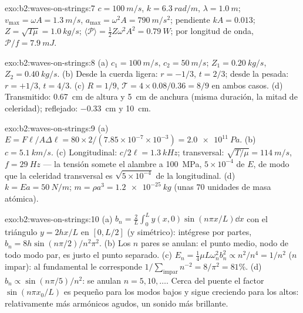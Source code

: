 \begin{solution}{exo:b2:waves-on-strings:7}
$c = \qty{100}{m/s}$, $k = \qty{6.3}{rad/m}$, $\lambda = \qty{1.0}{m}$; $v_{\max} = \omega A =
\qty{1.3}{m/s}$, $a_{\max} = \omega^2A = \qty{790}{m/s^2}$; pendiente $kA = 0.013$; $Z =
\sqrt{T\mu} = \qty{1.0}{kg/s}$; $\langle\mathcal P\rangle = \tfrac12Z\omega^2A^2 = \qty{0.79}{W}$;
por longitud de onda, $\mathcal P/f = \qty{7.9}{mJ}$.
\end{solution}

\begin{solution}{exo:b2:waves-on-strings:8}
(a) $c_1 = \qty{100}{m/s}$, $c_2 = \qty{50}{m/s}$; $Z_1 = \qty{0.20}{kg/s}$, $Z_2 = \qty{0.40}{kg/s}$.
(b) Desde la cuerda ligera: $r = -1/3$, $t = 2/3$; desde la pesada: $r =
+1/3$, $t = 4/3$. (c) $R = 1/9$, $\mathcal T = 4 \times 0.08/0.36 = 8/9$ en ambos casos.
(d) Transmitido: \qty{0.67}{cm} de altura y \qty{5}{cm} de anchura (misma duración, la mitad
de celeridad); reflejado: \qty{-0.33}{cm} y \qty{10}{cm}.
\end{solution}

\begin{solution}{exo:b2:waves-on-strings:9}
(a) $E = F\ell/A\Delta\ell = 80 \times 2/(7.85 \times 10^{-7} \times 10^{-3}) = \qty{2.0e11}{Pa}$.
(b) $c = \qty{5.1}{km/s}$. (c) Longitudinal: $c/2\ell = \qty{1.3}{kHz}$; transversal:
$\sqrt{T/\mu} = \qty{114}{m/s}$, $f = \qty{29}{Hz}$ --- la tensión somete el
alambre a \qty{100}{MPa}, $5 \times 10^{-4}$ de $E$, de modo que la celeridad transversal es
$\sqrt{5 \times 10^{-4}}$ de la longitudinal. (d) $k = Ea = \qty{50}{N/m}$; $m
= \rho a^3 = \qty{1.2e-25}{kg}$ (unas $70$ unidades de masa atómica).
\end{solution}

\begin{solution}{exo:b2:waves-on-strings:10}
(a) $b_n = \frac2L\int_0^Ly(x, 0)\sin(n\pi x/L)\dd x$ con el triángulo $y =
2hx/L$ en $[0, L/2]$ (y simétrico): intégrese por partes, $b_n = 8h\sin(n\pi/2)
/n^2\pi^2$. (b) Los $n$ pares se anulan: el punto medio, nodo de todo modo par,
es justo el punto separado. (c) $E_n = \tfrac14\mu L\omega_n^2b_n^2 \propto n^2/n^4 = 1/n^2$
($n$ impar): al fundamental le corresponde $1/\sum_{\text{impar}}n^{-2} = 8/\pi^2 = 81\%$. (d)
$b_n \propto \sin(n\pi/5)/n^2$: se anulan $n = 5, 10, \dots$. Cerca del puente el
factor $\sin(n\pi x_0/L)$ es pequeño para los modos bajos y sigue creciendo
para los altos: relativamente más armónicos agudos, un sonido más brillante.
\end{solution}

